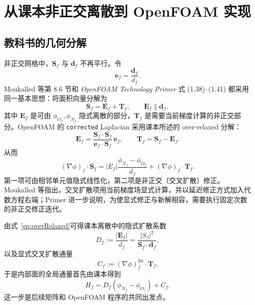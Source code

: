 \documentclass[UTF8,a4paper,11pt]{ctexart}
\newcommand{\vect}[1]{\bm{#1}}
\newcommand{\Sf}{\vect S_f}
\newcommand{\df}{\vect d_f}
\begin{document}
\section{从课本非正交离散到 OpenFOAM 实现}

\subsection{教科书的几何分解}

非正交网格中，\(\Sf\) 与 \(\df\) 不再平行。令
\begin{equation}
  \vect e_f=\frac{\df}{d_f}.
\end{equation}
Moukalled 等第 8.6 节和 \textit{OpenFOAM Technology Primer} 式 (1.38)--(1.41) 都采用同一基本思想：将面积向量分解为
\begin{equation}
  \Sf=\vect E_f+\vect T_f,
  \qquad \vect E_f\parallel\df,
  \label{eq:decompose}
\end{equation}
其中 \(\vect E_f\) 是可由 \(\phi_{O_f},\phi_{N_f}\) 隐式离散的部分，\(\vect T_f\) 是需要当前梯度计算的非正交部分。OpenFOAM 的 \texttt{corrected} Laplacian 采用课本所述的 over-relaxed 分解：
\begin{equation}
  \vect E_f
  =\frac{\Sf\cdot\Sf}{\vect e_f\cdot\Sf}\,\vect e_f,
  \qquad
  \vect T_f=\Sf-\vect E_f .
  \label{eq:overRelaxed}
\end{equation}
从而
\begin{equation}
  (\nabla\phi)_f\cdot\Sf
  =|E_f|\frac{\phi_{N_f}-\phi_{O_f}}{d_f}
   +(\nabla\phi)_f\cdot\vect T_f .
  \label{eq:crossdiff}
\end{equation}
第一项可由相邻单元值隐式线性化，第二项是非正交（交叉扩散）修正。Moukalled 等\cite[式 (8.66)--(8.71)，第 8.6.5 节]{Moukalled2016}指出，交叉扩散项用当前梯度场显式计算，并以延迟修正方式加入代数方程右端；Primer 进一步说明，为使显式修正与新解相容，需要执行固定次数的非正交修正迭代\cite[式 (1.38)--(1.41)，第 42--43 页]{OFPrimer}。

由式~\eqref{eq:overRelaxed}可得课本离散中的隐式扩散系数
\begin{equation}
  D_f
  :=\frac{|\vect E_f|}{d_f}
  =\frac{|S_f|^2}{\Sf\cdot\df},
  \label{eq:Dtextbook}
\end{equation}
以及显式交叉扩散通量
\begin{equation}
  C_f:=(\nabla\phi)_f^{\mathrm{lin}}\cdot\vect T_f.
  \label{eq:Ctextbook}
\end{equation}
于是内部面的全局通量首先由课本得到
\begin{equation}
  \boxed{H_f=D_f(\phi_{N_f}-\phi_{O_f})+C_f.}
  \label{eq:Htextbook}
\end{equation}
这一步是后续矩阵和 OpenFOAM 程序的共同出发点。
\end{document}
